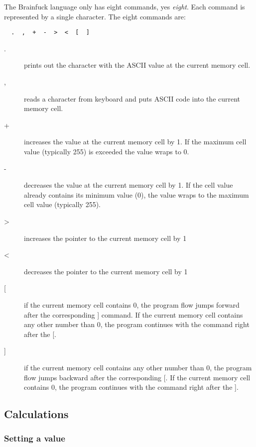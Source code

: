 \documentclass[ms,article,a4paper]{memoir}
\begin{document}
The Brainfuck language only has eight commands, yes \emph{eight}. Each command is represented by a single character. The eight commands are:

\begin{verbatim}
  .  ,  +  -  >  <  [  ]
\end{verbatim}

\begin{description}
\item[.] prints out the character with the ASCII value at the current memory cell.
\item[,] reads a character from keyboard and puts ASCII code into the current memory cell.
\item[+] increases the value at the current memory cell by 1. If the maximum cell value (typically 255) is exceeded the value wraps to 0.
\item[-] decreases the value at the current memory cell by 1. If the cell value already contains its minimum value (0), the value wraps to the maximum cell value (typically 255).
\item[>] increases the pointer to the current memory cell by 1
\item[<] decreases the pointer to the current memory cell by 1
\item[[] if the current memory cell contains 0, the program flow jumps forward after the corresponding ] command. If the current memory cell contains any other number than 0, the program continues with the command right after the [.
\item[{]}] if the current memory cell contains any other number than 0, the program flow jumps backward after the corresponding [. If the current memory cell contains 0, the program continues with the command right after the ].
\end{description}

\subsection{Calculations}

\subsubsection{Setting a value}
\end{document}
